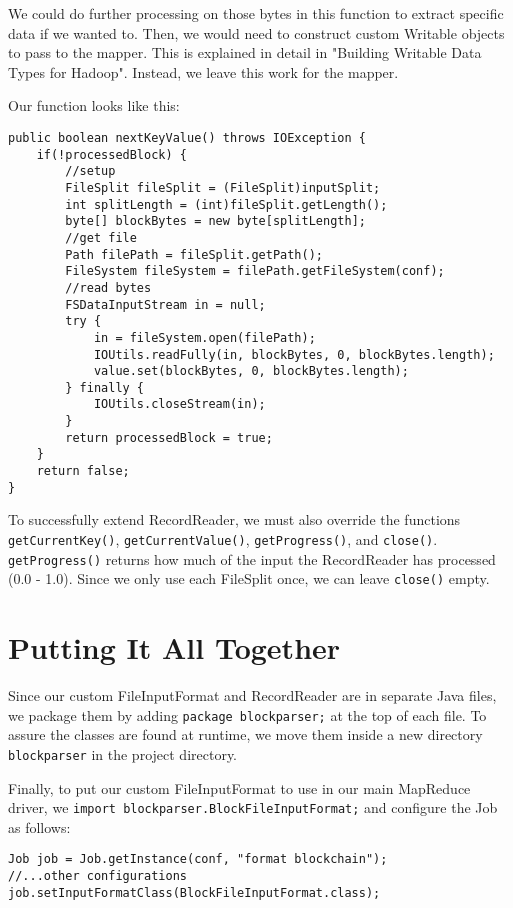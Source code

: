 \documentclass[9pt,twocolumn,twoside]{idsi}
\begin{document}
We could do further processing on those bytes in this function to extract specific data if we wanted to. Then, we would need to construct custom Writable objects to pass to the mapper. This is explained in detail in "Building Writable Data Types for Hadoop". Instead, we leave this work for the mapper.

Our function looks like this:

\begin{lstlisting}
public boolean nextKeyValue() throws IOException {
    if(!processedBlock) {
        //setup
        FileSplit fileSplit = (FileSplit)inputSplit;
        int splitLength = (int)fileSplit.getLength();
        byte[] blockBytes = new byte[splitLength];
        //get file
        Path filePath = fileSplit.getPath();
        FileSystem fileSystem = filePath.getFileSystem(conf);
        //read bytes
        FSDataInputStream in = null;
        try {
            in = fileSystem.open(filePath);
            IOUtils.readFully(in, blockBytes, 0, blockBytes.length);
            value.set(blockBytes, 0, blockBytes.length);
        } finally {
            IOUtils.closeStream(in);
        }
        return processedBlock = true;
    }
    return false;
}
\end{lstlisting}

To successfully extend RecordReader, we must also override the functions \lstinline{getCurrentKey()}, \lstinline{getCurrentValue()}, \lstinline{getProgress()}, and \lstinline{close()}. \lstinline{getProgress()} returns how much of the input the RecordReader has processed (0.0 - 1.0). Since we only use each FileSplit once, we can leave \lstinline{close()} empty.

\section{Putting It All Together}

Since our custom FileInputFormat and RecordReader are in separate Java files, we package them by adding \lstinline{package blockparser;} at the top of each file. To assure the classes are found at runtime, we move them inside a new directory \lstinline{blockparser} in the project directory.

Finally, to put our custom FileInputFormat to use in our main MapReduce driver, we \lstinline{import blockparser.BlockFileInputFormat;} and configure the Job as follows:

\begin{lstlisting}
Job job = Job.getInstance(conf, "format blockchain");
//...other configurations
job.setInputFormatClass(BlockFileInputFormat.class);
\end{lstlisting}
\end{document}
